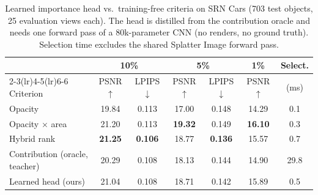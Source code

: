 \begin{table}[t]
\centering
\small
\setlength{\tabcolsep}{4pt}
\begin{tabular}{lcccccc}
\toprule
& \multicolumn{2}{c}{10\%} & \multicolumn{2}{c}{5\%} & 1\% & Select. \\
\cmidrule(lr){2-3}\cmidrule(lr){4-5}\cmidrule(lr){6-6}
Criterion & PSNR$\uparrow$ & LPIPS$\downarrow$ & PSNR$\uparrow$ & LPIPS$\downarrow$ & PSNR$\uparrow$ & (ms) \\
\midrule
Opacity & 19.84 & 0.113 & 17.00 & 0.148 & 14.29 & 0.1 \\
Opacity $\times$ area & 21.20 & 0.113 & \textbf{19.32} & 0.149 & \textbf{16.10} & 0.3 \\
Hybrid rank & \textbf{21.25} & \textbf{0.106} & 18.77 & \textbf{0.136} & 15.57 & 0.7 \\
Contribution (oracle, teacher) & 20.29 & 0.108 & 18.13 & 0.144 & 14.90 & 29.8 \\
\midrule
Learned head (ours) & 21.04 & 0.108 & 18.71 & 0.142 & 15.89 & 0.5 \\
\bottomrule
\end{tabular}
\caption{Learned importance head vs.\ training-free criteria on SRN Cars (703 test objects, 25 evaluation views each). The head is distilled from the contribution oracle and needs one forward pass of a $80$k-parameter CNN (no renders, no ground truth). Selection time excludes the shared Splatter Image forward pass.}
\label{tab:level2}
\end{table}
